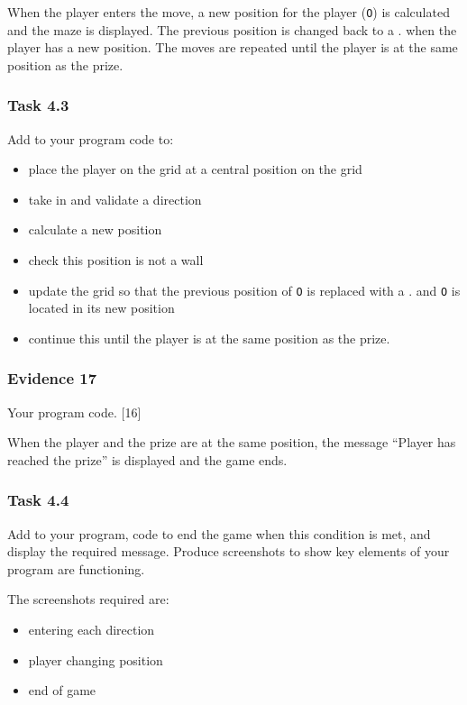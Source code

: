 When the player enters the move, a new position for the player (\textquotedbl\texttt{O}\textquotedbl )
is calculated and the maze is displayed. The previous position is
changed back to a \textquotedbl .\textquotedbl{} when the player
has a new position. The moves are repeated until the player is at
the same position as the prize.

\subsubsection*{Task 4.3}

Add to your program code to:
\begin{itemize}
\item place the player on the grid at a central position on the grid
\item take in and validate a direction
\item calculate a new position
\item check this position is not a wall
\item update the grid so that the previous position of \textquotedbl\texttt{O}\textquotedbl{}
is replaced with a \textquotedbl{} . \textquotedbl{} and \textquotedbl\texttt{O}\textquotedbl{}
is located in its new position
\item continue this until the player is at the same position as the prize.
\end{itemize}

\subsubsection*{Evidence 17}

Your program code. \hfill{} {[}16{]}

When the player and the prize are at the same position, the message
\textquotedblleft Player has reached the prize\textquotedblright{}
is displayed and the game ends.

\subsubsection*{Task 4.4}

Add to your program, code to end the game when this condition is met,
and display the required message. Produce screenshots to show key
elements of your program are functioning.

The screenshots required are:
\begin{itemize}
\item entering each direction
\item player changing position
\item end of game
\end{itemize}


